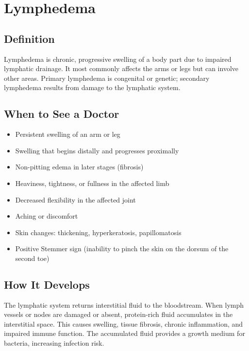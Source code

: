 \chapter{Lymphedema}

\section*{Definition}
Lymphedema is chronic, progressive swelling of a body part due to impaired lymphatic drainage. It most commonly affects the arms or legs but can involve other areas. Primary lymphedema is congenital or genetic; secondary lymphedema results from damage to the lymphatic system.

\section*{When to See a Doctor}
\begin{itemize}
\item Persistent swelling of an arm or leg
\item Swelling that begins distally and progresses proximally
\item Non-pitting edema in later stages (fibrosis)
\item Heaviness, tightness, or fullness in the affected limb
\item Decreased flexibility in the affected joint
\item Aching or discomfort
\item Skin changes: thickening, hyperkeratosis, papillomatosis
\item Positive Stemmer sign (inability to pinch the skin on the dorsum of the second toe)
\end{itemize}

\section*{How It Develops}
The lymphatic system returns interstitial fluid to the bloodstream. When lymph vessels or nodes are damaged or absent, protein-rich fluid accumulates in the interstitial space. This causes swelling, tissue fibrosis, chronic inflammation, and impaired immune function. The accumulated fluid provides a growth medium for bacteria, increasing infection risk.

